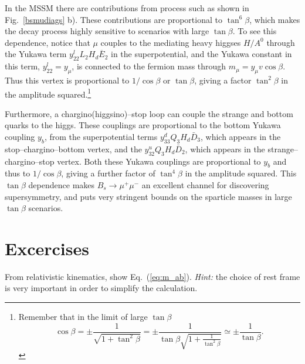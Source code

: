 \documentclass[notes.tex]{subfiles}
\begin{document}
In the MSSM there are contributions from process such as shown in Fig.~\ref{bsmudiags} b). These contributions are proportional to $\tan^6\beta$, which makes the decay process highly sensitive to scenarios with large $\tan\beta$. To see this dependence, notice that $\mu$ couples to the mediating heavy higgses $H/A^0$ through the Yukawa term $y^l_{22} L_2 H_d \overline{E}_2$ in the superpotential, and the Yukawa constant in this term, $y^l_{22} = y_\mu$, is connected to the fermion mass through $m_\mu = y_\mu v\cos\beta$. Thus this vertex is proportional to $1/\cos\beta$ or $\tan\beta$, giving a factor $\tan^2\beta$ in the amplitude squared.\footnote{Remember that in the limit of large $\tan\beta$
\begin{equation}
\cos\beta= \pm \frac{1}{\sqrt{1+\tan^2\beta}}= \pm \frac{1}{\tan\beta\sqrt{1+\frac{1}{\tan^2\beta}}}\simeq\pm \frac{1}{\tan\beta}.
\end{equation}
}

Furthermore, a chargino(higgsino)--stop loop can couple the strange and bottom quarks to the higgs. These couplings are proportional to the bottom Yukawa coupling $y_b$, from the superpotential terms $y_{33}^dQ_3H_d\bar D_3$, which appears in the stop--chargino--bottom vertex, and the  $y_{32}^uQ_3H_d\bar D_2$, which appears in the strange--chargino--stop vertex. Both these Yukawa couplings are proportional to $y_b$ and thus to  $1/\cos\beta$, giving a further factor of $\tan^4\beta$ in the amplitude squared. This $\tan\beta$ dependence makes $B_s \to \mu^+\mu^-$ an excellent channel for  discovering supersymmetry, and puts very stringent bounds on the sparticle masses in large $\tan\beta$ scenarios.


\section{Excercises}

\begin{Exercise}[]
From relativistic kinematics, show Eq.~(\ref{eq:m_ab}). {\it Hint:} the choice of rest frame is very important in order to simplify the calculation.
\end{Exercise}
\end{document}
